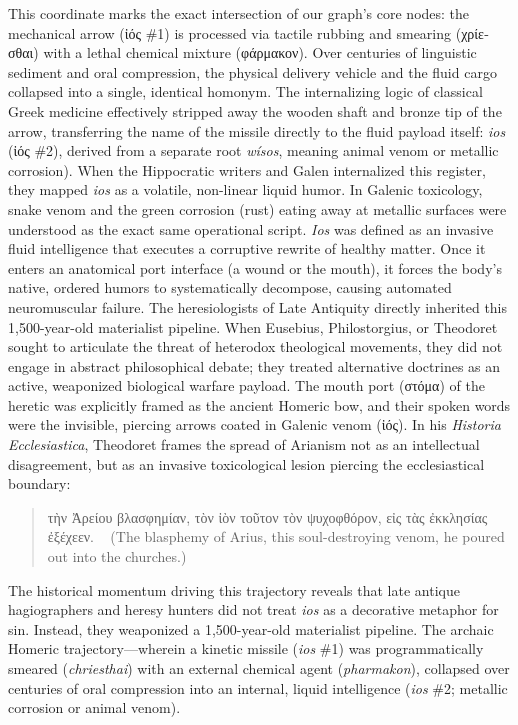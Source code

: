 \documentclass[11pt,twoside,a4paper]{article}
\begin{document}
This coordinate marks the exact intersection of our graph's core nodes: the mechanical arrow (\textgreek{ἰός} \#1) is processed via tactile rubbing and smearing (\textgreek{χρίεσθαι}) with a lethal chemical mixture (\textgreek{φάρμακον}). Over centuries of linguistic sediment and oral compression, the physical delivery vehicle and the fluid cargo collapsed into a single, identical homonym. The internalizing logic of classical Greek medicine effectively stripped away the wooden shaft and bronze tip of the arrow, transferring the name of the missile directly to the fluid payload itself: \textit{ios} (\textgreek{ἰός} \#2), derived from a separate root \textit{wísos}, meaning animal venom or metallic corrosion).
When the Hippocratic writers and Galen internalized this register, they mapped \textit{ios} as a volatile, non-linear liquid humor. In Galenic toxicology, snake venom and the green corrosion (rust) eating away at metallic surfaces were understood as the exact same operational script. \textit{Ios} was defined as an invasive fluid intelligence that executes a corruptive rewrite of healthy matter. Once it enters an anatomical port interface (a wound or the mouth), it forces the body's native, ordered humors to systematically decompose, causing automated neuromuscular failure.
The heresiologists of Late Antiquity directly inherited this 1,500-year-old materialist pipeline. When Eusebius, Philostorgius, or Theodoret sought to articulate the threat of heterodox theological movements, they did not engage in abstract philosophical debate; they treated alternative doctrines as an active, weaponized biological warfare payload. The mouth port (\textgreek{στόμα}) of the heretic was explicitly framed as the ancient Homeric bow, and their spoken words were the invisible, piercing arrows coated in Galenic venom (\textgreek{ἰός}).
In his \textit{Historia Ecclesiastica}, Theodoret frames the spread of Arianism not as an intellectual disagreement, but as an invasive toxicological lesion piercing the ecclesiastical boundary:

\begin{quote}
\textgreek{τὴν Ἀρείου βλασφημίαν, τὸν ἰὸν τοῦτον τὸν ψυχοφθόρον, εἰς τὰς ἐκκλησίας ἐξέχεεν.} \
\medskip
\small (The blasphemy of Arius, this soul-destroying venom, he poured out into the churches.)
\end{quote}

The historical momentum driving this trajectory reveals that late antique hagiographers 
and heresy hunters did not treat \textit{ios} as a decorative metaphor for sin. Instead, they 
weaponized a 1,500-year-old materialist pipeline. The archaic Homeric trajectory—wherein 
a kinetic missile (\textit{ios} \#1) was programmatically smeared (\textit{chriesthai}) with an 
external chemical agent (\textit{pharmakon}), collapsed over centuries of oral compression 
into an internal, liquid intelligence (\textit{ios} \#2; metallic corrosion or animal venom). 
\end{document}
